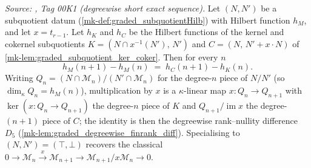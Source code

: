 \begin{lemma}\label{mk-lem:graded_subquotient_degreewise_diff}
  \leanok

  \textit{Source: \cite{stacks-project}, Tag 00K1 (degreewise short exact sequence).}
  Let \((N, N')\) be a subquotient datum (\ref{mk-def:graded_subquotientHilb}) with
  Hilbert function \(h_M\), and let \(x = t_{r-1}\). Let \(h_K\) and \(h_C\) be the
  Hilbert functions of the kernel and cokernel subquotients
  \(K = (N \cap x^{-1}(N'),\, N')\) and \(C = (N,\, N' + x \cdot N)\) of
  \ref{mk-lem:graded_subquotient_ker_coker}. Then for every \(n\)
  \[
    h_M(n+1) - h_M(n) \;=\; h_C(n+1) - h_K(n).
  \]
  Writing \(Q_n = (N \cap \mathcal{M}_n)/(N' \cap \mathcal{M}_n)\) for the
  degree-\(n\) piece of \(N/N'\) (so \(\dim_\kappa Q_n = h_M(n)\)), multiplication by
  \(x\) is a \(\kappa\)-linear map \(x : Q_n \to Q_{n+1}\) with
  \(\ker(x : Q_n \to Q_{n+1})\) the degree-\(n\) piece of \(K\) and
  \(Q_{n+1}/\operatorname{im} x\) the degree-\((n+1)\) piece of \(C\); the identity is
  then the degreewise rank--nullity difference \(D_5\)
  (\ref{mk-lem:graded_degreewise_finrank_diff}). Specialising to \((N, N') = (\top,
  \bot)\) recovers the classical \(0 \to \mathcal{M}_n \xrightarrow{x}
  \mathcal{M}_{n+1} \to \mathcal{M}_{n+1}/x\mathcal{M}_n \to 0\).
\end{lemma}
